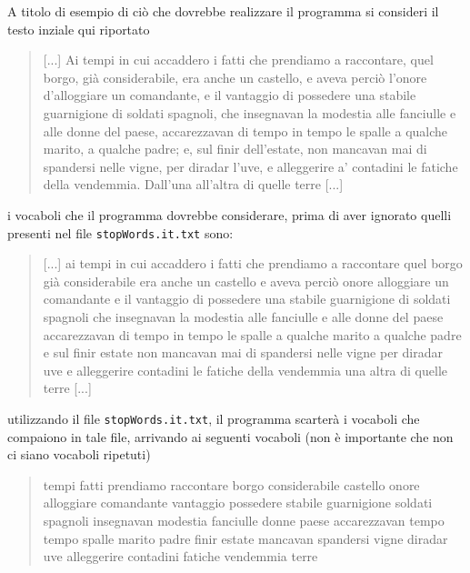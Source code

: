 A titolo di esempio di ci\`o che dovrebbe realizzare il programma si consideri il testo inziale qui riportato
\vspace{0.5em}
\begin{quotation}
[...] Ai tempi in cui accaddero i fatti che prendiamo a raccontare, quel 
borgo, gi\`a considerabile, era anche un castello, e aveva perci\`o l'onore 
d’alloggiare un comandante, e il vantaggio di possedere una stabile 
guarnigione di soldati spagnoli, che insegnavan la modestia alle fanciulle 
e alle donne del paese, accarezzavan di tempo in tempo le spalle a qualche 
marito, a qualche padre; e, sul finir dell’estate, non mancavan mai di 
spandersi nelle vigne, per diradar l'uve, e alleggerire a' contadini le fatiche 
della vendemmia. Dall'una all'altra di quelle terre [...]
\end{quotation}
\vspace{0.5em}
i vocaboli che il programma dovrebbe considerare, prima di aver ignorato quelli presenti nel file \texttt{stopWords.it.txt} sono:
\vspace{0.5em}
\begin{quotation}
[...] ai tempi in cui accaddero i fatti che prendiamo a raccontare quel borgo gi\`a considerabile era anche un castello e aveva perci\`o onore alloggiare un comandante e il vantaggio di possedere una stabile guarnigione di soldati spagnoli che insegnavan la modestia alle fanciulle e alle donne del paese accarezzavan di tempo in tempo le spalle a qualche marito a qualche padre e sul finir estate non mancavan mai di spandersi nelle vigne per diradar uve e alleggerire contadini le fatiche della vendemmia una altra di quelle terre [...]
\end{quotation}\vspace{0.5em}
utilizzando il file \texttt{stopWords.it.txt}, il programma scarter\`a i vocaboli che compaiono in tale file, arrivando ai seguenti vocaboli (non \`e importante che non ci siano vocaboli ripetuti)
\vspace{0.5em}
\begin{quotation}
tempi fatti prendiamo raccontare borgo considerabile castello onore alloggiare comandante vantaggio possedere stabile guarnigione soldati spagnoli insegnavan modestia fanciulle donne paese accarezzavan tempo tempo spalle marito padre finir estate  mancavan spandersi vigne diradar uve alleggerire contadini fatiche vendemmia terre
\end{quotation}
\vspace{1em}

